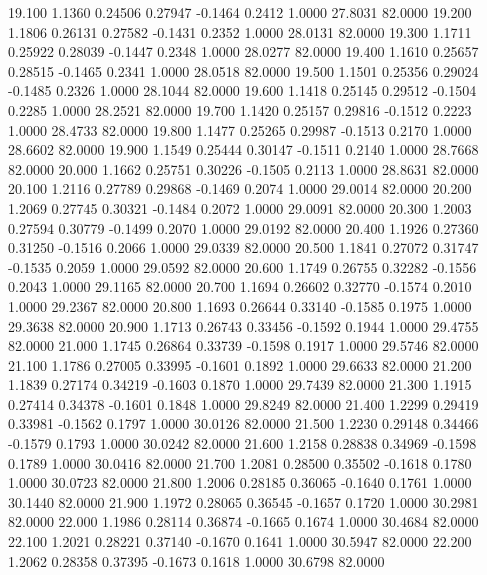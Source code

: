   19.100   1.1360   0.24506   0.27947  -0.1464   0.2412   1.0000  27.8031  82.0000
  19.200   1.1806   0.26131   0.27582  -0.1431   0.2352   1.0000  28.0131  82.0000
  19.300   1.1711   0.25922   0.28039  -0.1447   0.2348   1.0000  28.0277  82.0000
  19.400   1.1610   0.25657   0.28515  -0.1465   0.2341   1.0000  28.0518  82.0000
  19.500   1.1501   0.25356   0.29024  -0.1485   0.2326   1.0000  28.1044  82.0000
  19.600   1.1418   0.25145   0.29512  -0.1504   0.2285   1.0000  28.2521  82.0000
  19.700   1.1420   0.25157   0.29816  -0.1512   0.2223   1.0000  28.4733  82.0000
  19.800   1.1477   0.25265   0.29987  -0.1513   0.2170   1.0000  28.6602  82.0000
  19.900   1.1549   0.25444   0.30147  -0.1511   0.2140   1.0000  28.7668  82.0000
  20.000   1.1662   0.25751   0.30226  -0.1505   0.2113   1.0000  28.8631  82.0000
  20.100   1.2116   0.27789   0.29868  -0.1469   0.2074   1.0000  29.0014  82.0000
  20.200   1.2069   0.27745   0.30321  -0.1484   0.2072   1.0000  29.0091  82.0000
  20.300   1.2003   0.27594   0.30779  -0.1499   0.2070   1.0000  29.0192  82.0000
  20.400   1.1926   0.27360   0.31250  -0.1516   0.2066   1.0000  29.0339  82.0000
  20.500   1.1841   0.27072   0.31747  -0.1535   0.2059   1.0000  29.0592  82.0000
  20.600   1.1749   0.26755   0.32282  -0.1556   0.2043   1.0000  29.1165  82.0000
  20.700   1.1694   0.26602   0.32770  -0.1574   0.2010   1.0000  29.2367  82.0000
  20.800   1.1693   0.26644   0.33140  -0.1585   0.1975   1.0000  29.3638  82.0000
  20.900   1.1713   0.26743   0.33456  -0.1592   0.1944   1.0000  29.4755  82.0000
  21.000   1.1745   0.26864   0.33739  -0.1598   0.1917   1.0000  29.5746  82.0000
  21.100   1.1786   0.27005   0.33995  -0.1601   0.1892   1.0000  29.6633  82.0000
  21.200   1.1839   0.27174   0.34219  -0.1603   0.1870   1.0000  29.7439  82.0000
  21.300   1.1915   0.27414   0.34378  -0.1601   0.1848   1.0000  29.8249  82.0000
  21.400   1.2299   0.29419   0.33981  -0.1562   0.1797   1.0000  30.0126  82.0000
  21.500   1.2230   0.29148   0.34466  -0.1579   0.1793   1.0000  30.0242  82.0000
  21.600   1.2158   0.28838   0.34969  -0.1598   0.1789   1.0000  30.0416  82.0000
  21.700   1.2081   0.28500   0.35502  -0.1618   0.1780   1.0000  30.0723  82.0000
  21.800   1.2006   0.28185   0.36065  -0.1640   0.1761   1.0000  30.1440  82.0000
  21.900   1.1972   0.28065   0.36545  -0.1657   0.1720   1.0000  30.2981  82.0000
  22.000   1.1986   0.28114   0.36874  -0.1665   0.1674   1.0000  30.4684  82.0000
  22.100   1.2021   0.28221   0.37140  -0.1670   0.1641   1.0000  30.5947  82.0000
  22.200   1.2062   0.28358   0.37395  -0.1673   0.1618   1.0000  30.6798  82.0000
